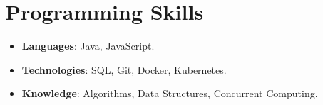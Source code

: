 \documentclass[letterpaper,10pt]{article}
\newcommand{\resumeSubHeadingListStart}{\begin{itemize}[leftmargin=*]}
\newcommand{\resumeSubHeadingListEnd}{\end{itemize}}
\begin{document}
\section{Programming Skills}
 \resumeSubHeadingListStart
   \item{
     \textbf{Languages}{: Java, JavaScript. }
   }\vspace{-7pt}
   \item{
     \textbf{Technologies}{: SQL, Git, Docker, Kubernetes. }
   }
   \vspace{-7pt}
   \item{
     \textbf{Knowledge}{: Algorithms, Data Structures, Concurrent Computing.}
   }
 \resumeSubHeadingListEnd


\end{document}
